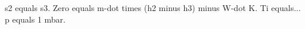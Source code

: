 s2 equals s3.  
Zero equals m-dot times (h2 minus h3) minus W-dot K.  
Ti equals...  
p equals 1 mbar.